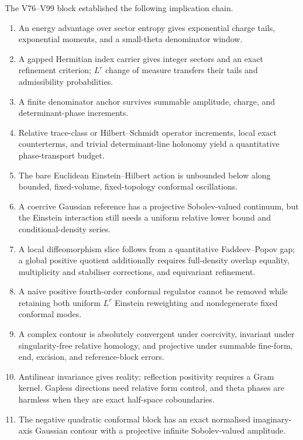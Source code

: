 \documentclass[11pt]{article}
\begin{document}
The V76--V99 block established the following implication chain.
\begin{enumerate}
\item An energy advantage over sector entropy gives exponential charge
      tails, exponential moments, and a small-theta denominator
      window.
\item A gapped Hermitian index carrier gives integer sectors and an
      exact refinement criterion; \(L^r\) change of measure transfers
      their tails and admissibility probabilities.
\item A finite denominator anchor survives summable amplitude, charge,
      and determinant-phase increments.
\item Relative trace-class or Hilbert--Schmidt operator increments,
      local exact counterterms, and trivial determinant-line holonomy
      yield a quantitative phase-transport budget.
\item The bare Euclidean Einstein--Hilbert action is unbounded below
      along bounded, fixed-volume, fixed-topology conformal
      oscillations.
\item A coercive Gaussian reference has a projective Sobolev-valued
      continuum, but the Einstein interaction still needs a uniform
      relative lower bound and conditional-density series.
\item A local diffeomorphism slice follows from a quantitative
      Faddeev--Popov gap; a global positive quotient additionally
      requires full-density overlap equality, multiplicity and
      stabiliser corrections, and equivariant refinement.
\item A naive positive fourth-order conformal regulator cannot be
      removed while retaining both uniform \(L^r\) Einstein
      reweighting and nondegenerate fixed conformal modes.
\item A complex contour is absolutely convergent under coercivity,
      invariant under singularity-free relative homology, and
      projective under summable fine-form, end, excision, and
      reference-block errors.
\item Antilinear invariance gives reality; reflection positivity
      requires a Gram kernel.  Gapless directions need relative form
      control, and theta phases are harmless when they are exact
      half-space coboundaries.
\item The negative quadratic conformal block has an exact normalised
      imaginary-axis Gaussian contour with a projective infinite
      Sobolev-valued amplitude.
\end{enumerate}
\end{document}
